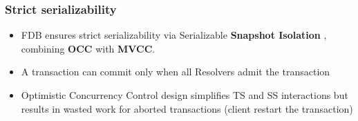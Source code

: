 \begin{frame}
	\frametitle{Strict serializability}
\begin{itemize}
  \item FDB ensures strict serializability via Serializable \textbf{Snapshot Isolation} , combining \textbf{OCC} with \textbf{MVCC}.
  \item A transaction can commit only when all Resolvers admit the transaction
  \item Optimistic Concurrency Control design simplifies TS and SS interactions but results in wasted work for aborted transactions (client restart the transaction)
\end{itemize}

 \end{frame}




